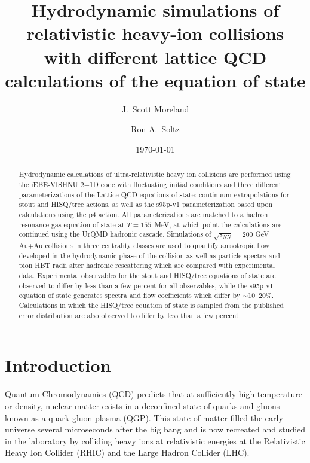 \documentclass[aps,prc,reprint,amsmath,nofootinbib,superscriptaddress]{revtex4-1}
\begin{document}
\title{Hydrodynamic simulations of relativistic heavy-ion collisions\\ with different lattice QCD calculations of the equation of state}

\author{J.\ Scott Moreland}
\author{Ron A.\ Soltz}

\date{\today}

\begin{abstract}
Hydrodynamic calculations of ultra-relativistic heavy ion collisions are performed using the iEBE-VISHNU 2+1D code with fluctuating initial conditions and three different parameterizations of the Lattice QCD equations of state: continuum extrapolations for stout and HISQ/tree actions, as well as the s95p-v1 parameterization based upon calculations using the p4 action.  All parameterizations are matched to a hadron resonance gas equation of state at $T=155$~MeV, at which point the calculations are continued using the UrQMD hadronic cascade. Simulations of $\sqrt{s_{NN}}=200$ GeV Au+Au collisions in three centrality classes are used to quantify anisotropic flow developed in the hydrodynamic phase of the collision as well as particle spectra and pion HBT radii after hadronic rescattering which are compared with experimental data. Experimental observables for the stout and HISQ/tree equations of state are observed to differ by less than a few percent for all observables, while the s95p-v1 equation of state generates spectra and flow coefficients which differ by $\sim$10--20\%. Calculations in which the HISQ/tree equation of state is sampled from the published error distribution are also observed to differ by less than a few percent.
\end{abstract}

\maketitle

\section{Introduction}

Quantum Chromodynamics (QCD) predicts that at sufficiently high temperature or density, nuclear matter exists in a deconfined state of quarks and gluons known as a quark-gluon plasma (QGP). 
This state of matter filled the early universe several microseconds after the big bang and is now recreated and studied in the laboratory by colliding heavy ions at relativistic energies at the Relativistic Heavy Ion Collider (RHIC) and the Large Hadron Collider (LHC).
\end{document}
